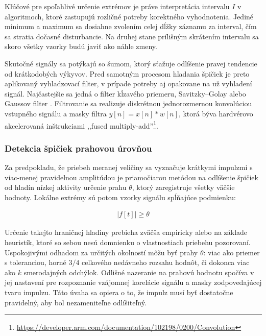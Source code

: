 Kľúčové pre spoľahlivé určenie extrémov je práve interpretácia intervalu $I$ v algoritmoch, ktoré zastupujú rozličné 
potreby korektného vyhodnotenia. Jediné minimum a maximum sa dosiahne zvolením celej dĺžky záznamu za interval, čím sa 
stratia dočasné disturbancie. Na druhej stane prílišným skrátením intervalu sa skoro všetky vzorky budú javiť ako náhle zmeny.

Skutočné signály sa potýkajú so šumom, ktorý sťažuje odlíšenie pravej tendencie od krátkodobých výkyvov. 
Pred samotným procesom hľadania špičiek je preto aplikovaný vyhladzovací filter, v prípade potreby aj opakovane na už
vyhladení signál. Najčastejšie sa jedná o filter 
kĺzavého priemeru, Savitzky–Golay alebo Gaussov filter \cite{spectrometry-peak-detection}. Filtrovanie sa realizuje 
diskrétnou jednorozmernou konvolúciou vstupného signálu a masky filtra $y[n] = x[n] * w[n]$, 
ktorá býva hardvérovo akcelerovaná inštrukciami 
,,fused multiply-add''\footnote{\url{https://developer.arm.com/documentation/102198/0200/Convolution}}.

\subsubsection{Detekcia špičiek prahovou úrovňou}
Za predpokladu, že priebeh meranej veličiny sa vyznačuje krátkymi impulzmi s viac-menej pravidelnou amplitúdou 
je priamočiarou metódou na odlíšenie špičiek od hladín nízkej aktivity určenie prahu $\theta$, ktorý zaregistruje
všetky väčšie hodnoty. Lokálne extrémy sú potom vzorky signálu spĺňajúce podmienku: 
\begin{ceqn}\begin{align}
|f[t]| \geq \theta
\end{align}\end{ceqn}

Určenie takejto hraničnej hladiny prebieha zväčša empiricky alebo na základe heuristík, ktoré so sebou nesú 
domnienku o vlastnostiach priebehu pozorovaní. Uspokojivými odhadom za určitých okolností môžu byť prahy $\theta$: 
viac ako priemer s toleranciou, horné $3/4$ celkového nedávneho rozsahu hodnôt, či dokonca viac ako $k$
smerodajných odchýlok. Odlišné nazeranie na prahovú hodnotu spočíva v jej nastavení pre rozpoznanie 
vzájomnej korelácie signálu a masky zodpovedajúcej tvaru impulzu. Táto úvaha sa opiera o to, že impulz
musí byť dostatočne pravidelný, aby bol nezameniteľne odlíšiteľný.

